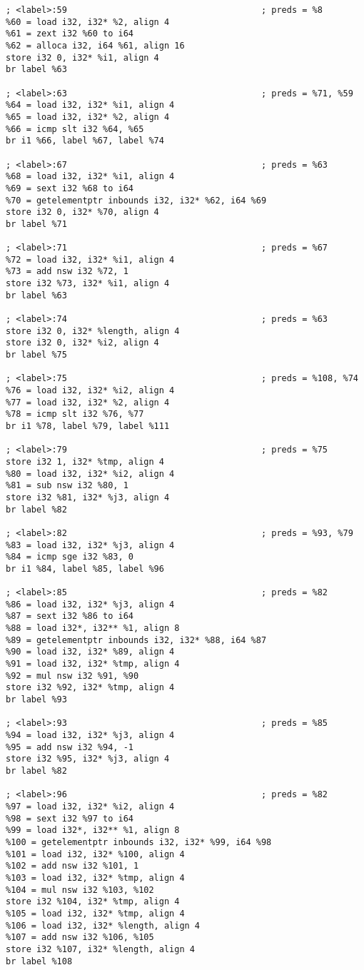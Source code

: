 \begin{verbatim}
; <label>:59                                      ; preds = %8
%60 = load i32, i32* %2, align 4
%61 = zext i32 %60 to i64
%62 = alloca i32, i64 %61, align 16
store i32 0, i32* %i1, align 4
br label %63

; <label>:63                                      ; preds = %71, %59
%64 = load i32, i32* %i1, align 4
%65 = load i32, i32* %2, align 4
%66 = icmp slt i32 %64, %65
br i1 %66, label %67, label %74

; <label>:67                                      ; preds = %63
%68 = load i32, i32* %i1, align 4
%69 = sext i32 %68 to i64
%70 = getelementptr inbounds i32, i32* %62, i64 %69
store i32 0, i32* %70, align 4
br label %71

; <label>:71                                      ; preds = %67
%72 = load i32, i32* %i1, align 4
%73 = add nsw i32 %72, 1
store i32 %73, i32* %i1, align 4
br label %63

; <label>:74                                      ; preds = %63
store i32 0, i32* %length, align 4
store i32 0, i32* %i2, align 4
br label %75

; <label>:75                                      ; preds = %108, %74
%76 = load i32, i32* %i2, align 4
%77 = load i32, i32* %2, align 4
%78 = icmp slt i32 %76, %77
br i1 %78, label %79, label %111

; <label>:79                                      ; preds = %75
store i32 1, i32* %tmp, align 4
%80 = load i32, i32* %i2, align 4
%81 = sub nsw i32 %80, 1
store i32 %81, i32* %j3, align 4
br label %82

; <label>:82                                      ; preds = %93, %79
%83 = load i32, i32* %j3, align 4
%84 = icmp sge i32 %83, 0
br i1 %84, label %85, label %96

; <label>:85                                      ; preds = %82
%86 = load i32, i32* %j3, align 4
%87 = sext i32 %86 to i64
%88 = load i32*, i32** %1, align 8
%89 = getelementptr inbounds i32, i32* %88, i64 %87
%90 = load i32, i32* %89, align 4
%91 = load i32, i32* %tmp, align 4
%92 = mul nsw i32 %91, %90
store i32 %92, i32* %tmp, align 4
br label %93

; <label>:93                                      ; preds = %85
%94 = load i32, i32* %j3, align 4
%95 = add nsw i32 %94, -1
store i32 %95, i32* %j3, align 4
br label %82

; <label>:96                                      ; preds = %82
%97 = load i32, i32* %i2, align 4
%98 = sext i32 %97 to i64
%99 = load i32*, i32** %1, align 8
%100 = getelementptr inbounds i32, i32* %99, i64 %98
%101 = load i32, i32* %100, align 4
%102 = add nsw i32 %101, 1
%103 = load i32, i32* %tmp, align 4
%104 = mul nsw i32 %103, %102
store i32 %104, i32* %tmp, align 4
%105 = load i32, i32* %tmp, align 4
%106 = load i32, i32* %length, align 4
%107 = add nsw i32 %106, %105
store i32 %107, i32* %length, align 4
br label %108


\end{verbatim}
